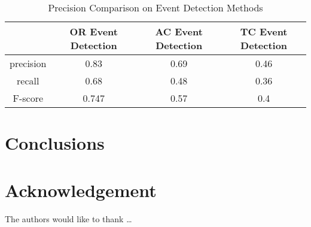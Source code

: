 \begin{table}  \centering
  \caption{Precision Comparison on Event Detection Methods}
  \label{tbl:overall-experiments}
  \begin{tabular}{cccc}
\toprule
    & OR Event Detection & AC Event Detection & TC Event Detection \\
\midrule
    precision & 0.83 & 0.69 & 0.46 \\
    recall & 0.68 & 0.48 & 0.36 \\
    F-score & 0.747 & 0.57 & 0.4 \\
\bottomrule
\end{tabular}
\end{table}


\section{Conclusions} \label{sec-conclusions}

\blindtext

\section*{Acknowledgement}

\lipsum[1]


The authors would like to thank \ldots

